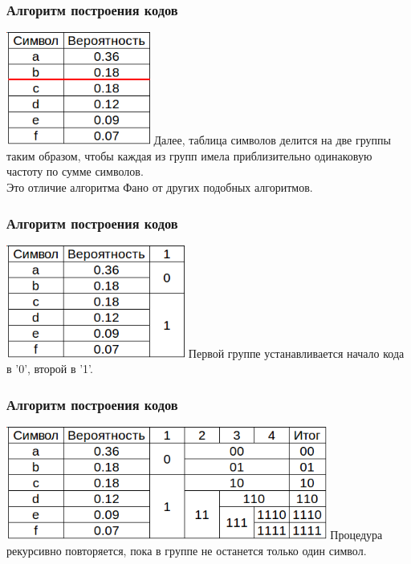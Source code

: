 \documentclass[10pt,pdf,hyperref={unicode}]{beamer}
\begin{document}
	\begin{frame}[t]
		\frametitle{Алгоритм построения кодов}
		\includegraphics[height=10em]{alg1.png}
		\vspace{1em}
		\newline
		Далее, таблица символов делится на две группы таким образом,
		чтобы каждая из групп имела приблизительно одинаковую частоту
		по сумме символов.\\
		Это отличие алгоритма Фано от других подобных алгоритмов.\\
		
	\end{frame}

	\begin{frame}[t]
		\frametitle{Алгоритм построения кодов}
		\includegraphics[height=10em]{alg2.png}
		\vspace{1em}
		\newline
		Первой группе устанавливается начало кода в '0', второй в '1'.\\
		
	\end{frame}

	\begin{frame}[t]
		\frametitle{Алгоритм построения кодов}
		\includegraphics[height=10em]{alg3.png}
		\vspace{1em}
		\newline
		Процедура рекурсивно повторяется, пока в группе не останется только один символ.\\
		
	\end{frame}
\end{document}

